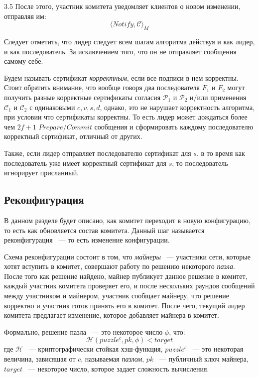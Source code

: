 3.5 После этого, участник комитета уведомляет клиентов о новом изменении, отправляя им:
 \[ \langle Notify, \mathcal{C} \rangle_M \]

Следует отметить, что лидер следует всем шагам алгоритма действуя и как лидер, и как последователь. За исключением того, что он не отправляет сообщения самому себе.

Будем называть сертификат \textit{корректным}, если все подписи в нем корректны.
Стоит обратить внимание, что вообще говоря два последователя $F_1$ и $F_2$ могут получить разные корректные сертификаты согласия $\mathcal{P}_1$ и $\mathcal{P}_2$ и/или применения $\mathcal{C}_1$ и $\mathcal{C}_2$ с одинаковыми $c, v, s, d$, однако, это не нарушает корректность алгоритма, при условии что сертификаты корректны.
То есть лидер может дождаться более чем $2f+1$ $Prepare$/$Commit$ сообщения и сформировать каждому последователю корректный сертификат, отличный от других.

Также, если лидер отправляет последователю сертификат для $s$, в то время как последователь уже имеет корректный сертификат для $s$, то последователь игнорирует присланный.

\subsection{Реконфигурация} \label{reconfig}
В данном разделе будет описано, как комитет переходит в новую конфигурацию, то есть как обновляется состав комитета. Данный шаг называется реконфигурация ~--- то есть изменение конфигурации.

Схема реконфигурации состоит в том, что \textit{майнеры} ~--- участники сети, которые хотят вступить в комитет, совершают работу по решению некоторого \textit{пазла}. После того как решение найдено, майнер публикует данное решение в комитет, каждый участник комитета проверяет его, и после нескольких раундов сообщений между участником и майнером, участник сообщает майнеру, что решение корректно и участник готов принять его в комитет.
После чего, текущий лидер комитета предлагает изменение, которое добавляет майнера в комитет.

Формально, решение пазла ~--- это некоторое число $\phi$, что:
$$\mathcal{H}(puzzle^c, pk, \phi) < target$$
где $\mathcal{H}$ ~--- криптографически стойкая хэш-функция, $puzzle^c$ ~--- это некоторая величина, зависящая от $c$, называемая \textit{пазлом}, $pk$ ~--- публичный ключ майнера, $target$ ~--- некоторое число, которое задает сложность вычисления.

